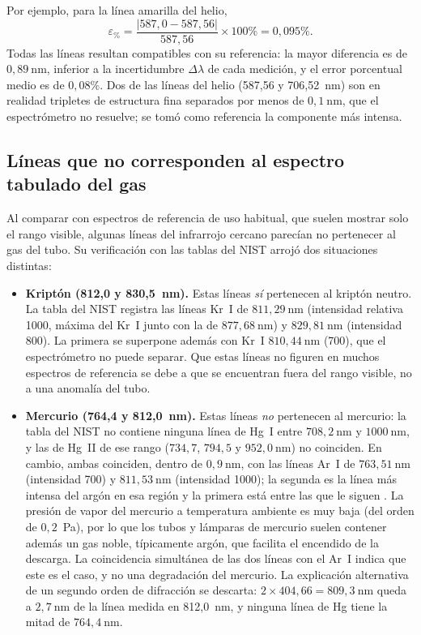 \documentclass{article}
\newcommand{\nm}{\ \mathrm{nm}}
\begin{document}
Por ejemplo, para la línea amarilla del helio,
\begin{equation*}
    \varepsilon_{\%}=\frac{|587,0-587,56|}{587,56}\times100\%=0,095\%.
\end{equation*}
Todas las líneas resultan compatibles con su referencia: la mayor diferencia es de $0,89\nm$, inferior a la incertidumbre $\Delta\lambda$ de cada medición, y el error porcentual medio es de $0,08\%$. Dos de las líneas del helio (587,56 y 706,52~nm) son en realidad tripletes de estructura fina separados por menos de $0,1\nm$, que el espectrómetro no resuelve; se tomó como referencia la componente más intensa.

\subsection{Líneas que no corresponden al espectro tabulado del gas}

Al comparar con espectros de referencia de uso habitual, que suelen mostrar solo el rango visible, algunas líneas del infrarrojo cercano parecían no pertenecer al gas del tubo. Su verificación con las tablas del NIST arrojó dos situaciones distintas:

\begin{itemize}
    \item \textbf{Kriptón (812,0 y 830,5~nm).} Estas líneas \emph{sí} pertenecen al kriptón neutro. La tabla del NIST \cite{nist-kr} registra las líneas Kr~I de $811,29\nm$ (intensidad relativa 1000, máxima del Kr~I junto con la de $877,68\nm$) y $829,81\nm$ (intensidad 800). La primera se superpone además con Kr~I $810,44\nm$ (700), que el espectrómetro no puede separar. Que estas líneas no figuren en muchos espectros de referencia se debe a que se encuentran fuera del rango visible, no a una anomalía del tubo.

    \item \textbf{Mercurio (764,4 y 812,0~nm).} Estas líneas \emph{no} pertenecen al mercurio: la tabla del NIST \cite{nist-hg} no contiene ninguna línea de Hg~I entre $708,2\nm$ y $1000\nm$, y las de Hg~II de ese rango ($734,7$, $794,5$ y $952,0\nm$) no coinciden. En cambio, ambas coinciden, dentro de $0,9\nm$, con las líneas Ar~I de $763,51\nm$ (intensidad 700) y $811,53\nm$ (intensidad 1000); la segunda es la línea más intensa del argón en esa región y la primera está entre las que le siguen \cite{nist-ar}. La presión de vapor del mercurio a temperatura ambiente es muy baja (del orden de $0,2$~Pa), por lo que los tubos y lámparas de mercurio suelen contener además un gas noble, típicamente argón, que facilita el encendido de la descarga. La coincidencia simultánea de las dos líneas con el Ar~I indica que este es el caso, y no una degradación del mercurio. La explicación alternativa de un segundo orden de difracción se descarta: $2\times404,66=809,3\nm$ queda a $2,7\nm$ de la línea medida en 812,0~nm, y ninguna línea de Hg tiene la mitad de $764,4\nm$.
\end{itemize}
\end{document}
